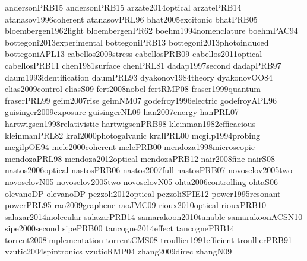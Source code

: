 andersonPRB15                  andersonPRB15
arzate2014optical              arzatePRB14
atanasov1996coherent           atanasovPRL96
bhat2005excitonic              bhatPRB05
bloembergen1962light           bloembergenPR62
boehm1994nomenclature          boehmPAC94
bottegoni2013experimental      bottegoniPRB13
bottegoni2013photoinduced      bottegoniAPL13
cabellos2009stress             cabellosPRB09
cabellos2011optical            cabellosPRB11
chen1981surface                chenPRL81
dadap1997second                dadapPRB97
daum1993identification         daumPRL93
dyakonov1984theory             dyakonovOO84
elias2009control               eliasS09
fert2008nobel                  fertRMP08
fraser1999quantum              fraserPRL99
geim2007rise                   geimNM07
godefroy1996electric           godefroyAPL96
guisinger2009exposure          guisingerNL09
han2007energy                  hanPRL07
hartwigsen1998relativistic     hartwigsenPRB98
kleinman1982efficacious        kleinmanPRL82
kral2000photogalvanic          kralPRL00
mcgilp1994probing              mcgilpOE94
mele2000coherent               melePRB00
mendoza1998microscopic         mendozaPRL98
mendoza2012optical             mendozaPRB12
nair2008fine                   nairS08
nastos2006optical              nastosPRB06
nastos2007full                 nastosPRB07
novoselov2005two               novoselovN05
novoselov2005two               novoselovN05
ohta2006controlling            ohtaS06
olevanoDP                      olevanoDP
pezzoli2012optical             pezzoliSPIE12
power1995resonant              powerPRL95
rao2009graphene                raoJMC09
rioux2010optical               riouxPRB10
salazar2014molecular           salazarPRB14
samarakoon2010tunable          samarakoonACSN10
sipe2000second                 sipePRB00
tancogne2014effect             tancognePRB14
torrent2008implementation      torrentCMS08
troullier1991efficient         troullierPRB91
vzutic2004spintronics          vzuticRMP04
zhang2009direc                 zhangN09
